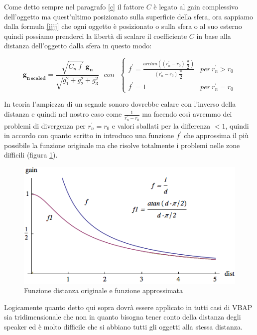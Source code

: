 \documentclass[12pt,a4paper]{report}
\begin{document}
\begin{itemize}
Come detto sempre nel paragrafo \ref{c} il fattore $C$ è legato al gain complessivo dell'oggetto ma quest'ultimo posizionato sulla superficie della sfera, ora sappiamo dalla formula \ref{jjjj} che ogni oggetto è posizionato o sulla sfera o al suo esterno quindi possiamo prenderci la libertà di scalare il coefficiente $C$ in base alla distanza dell'oggetto dalla sfera in questo modo:

\begin{equation}
\boldsymbol{g_{n\ scaled}} = \dfrac{\sqrt{C_n \ f^{\prime}}\ \boldsymbol{g_n}}{\sqrt{g_1^2 +g_2^2 + g_3^2}} \ \ \ con \ \ \ \left\{\begin{matrix}
f^{\prime}= \frac{arctan\left((r_n^{\prime}-r_0)\ \dfrac{\pi}{2}\right)}{(r_n^{\prime}-r_0)\ \dfrac{\pi}{2}} & per\ r_n^{\prime}>r_0
\\
f^{\prime}=1 & per\ r_n^{\prime}=r_0
\end{matrix}\right.
\label{kkkk}
\end{equation}

In teoria l'ampiezza di un segnale sonoro dovrebbe calare con l'inverso della distanza e quindi nel nostro caso come $\frac{1}{r_n^{\prime}-r_0}$ ma facendo così avremmo dei problemi di divergenza per $r_n^{\prime}=r_0$ e valori sballati per la differenza $<1$, quindi in accordo con quanto scritto in \cite{distanza} introduco una funzione $f^{\prime}$ che approssima il più possibile la funzione originale ma che risolve totalmente i problemi nelle zone difficili (figura \ref{fig:distance}).

\begin{figure}[htbp]
	\centering
	\includegraphics[scale=0.60]{figures/distance.png}
	\caption {Funzione distanza originale e funzione approssimata}
	\label{fig:distance}
	\end{figure}

Logicamente quanto detto qui sopra dovrà essere applicato in tutti casi di VBAP sia tridimensionale che non in quanto bisogna tener conto della distanza degli speaker ed è molto difficile che si abbiano tutti gli oggetti alla stessa distanza.


\end{itemize}
\end{document}
